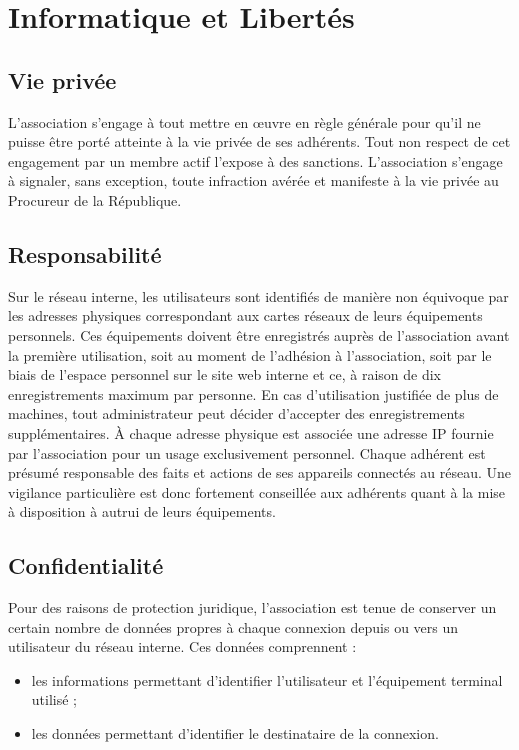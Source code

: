 \documentclass[12pt]{article}
\begin{document}
\section{Informatique et Libertés}

    \subsection{Vie privée}


		L’association s’engage à tout mettre en œuvre en règle générale pour qu’il ne puisse être porté atteinte à la vie privée de ses adhérents. Tout non respect de cet engagement par un membre actif l’expose à des sanctions. L’association s’engage à signaler, sans exception, toute infraction avérée et manifeste à la vie privée au Procureur de la République.

    \subsection{Responsabilité}


		Sur le réseau interne, les utilisateurs sont identifiés de manière non équivoque par les adresses physiques correspondant aux cartes réseaux de leurs équipements personnels. Ces équipements doivent être enregistrés auprès de l'association avant la première utilisation, soit au moment de l'adhésion à l'association, soit par le biais de l'espace personnel sur le site web interne et ce, à raison de dix enregistrements maximum par personne. En cas d'utilisation justifiée de plus de machines, tout administrateur peut décider d'accepter des enregistrements supplémentaires. À chaque adresse physique est associée une adresse IP fournie par l'association pour un usage exclusivement personnel. Chaque adhérent est présumé responsable des faits et actions de ses appareils connectés au réseau. Une vigilance particulière est donc fortement conseillée aux adhérents quant à la mise à disposition à autrui de leurs équipements.

    \subsection{Confidentialité}

		Pour des raisons de protection juridique, l'association est tenue de conserver un certain nombre de données propres à chaque connexion depuis ou vers un utilisateur du réseau interne. Ces données comprennent :

		\begin{itemize}
 			\item[\textbullet] les informations permettant d'identifier l'utilisateur et l'équipement terminal utilisé ;
 			\item[\textbullet] les données permettant d'identifier le destinataire de la connexion.
 		\end{itemize}
\end{document}
